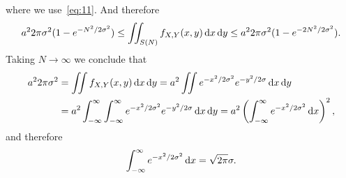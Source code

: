 \begin{exercise}
\begin{solution}
where we use~\cref{eq:11}.
And therefore
\begin{equation}
a^{2}2\pi{\sigma^{2}} (1-e^{-N^{2}/2\sigma^{2}}) \leq
  \iint_{S(N)}f_{X,Y}(x,y) \,\textrm{d}x\,\textrm{d}y \leq
a^{2}2\pi{\sigma^{2}} (1-e^{-2N^{2}/2\sigma^{2}}).
\end{equation}
Taking $N\to\infty$ we conclude that
\begin{align}
a^{2}2\pi{\sigma^{2}}
&=\iint f_{X,Y}(x,y) \,\textrm{d}x\,\textrm{d}y
=a^{2}  \iint e^{-x^{2}/2\sigma^{2}} e^{-y^{2}/2\sigma} \,\textrm{d}x\,\textrm{d}y\\
&=a^{2}  \int_{-\infty}^{\infty} \int_{-\infty}^{\infty }e^{-x^{2}/2\sigma^{2}} e^{-y^{2}/2\sigma} \,\textrm{d}x\,\textrm{d}y
=a^{2} \left( \int_{-\infty}^{\infty }e^{-x^{2}/2\sigma^{2}} \,\textrm{d}x\right)^{2},
\end{align}
and therefore
\begin{equation}
\label{eq:18}
\int_{-\infty}^{\infty }e^{-x^{2}/2\sigma^{2}} \,\textrm{d}x = \sqrt{2 \pi}\sigma.
\end{equation}
\end{solution}
\end{exercise}


